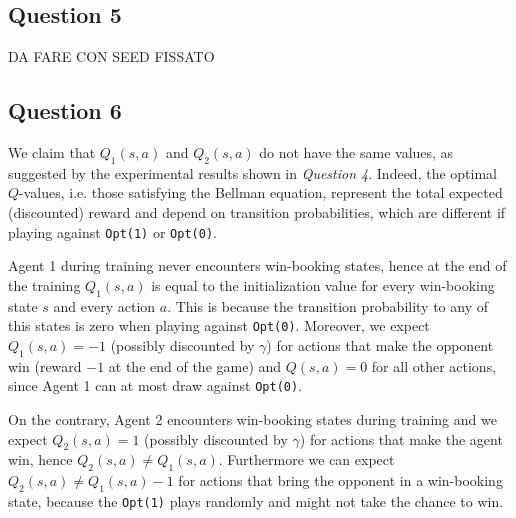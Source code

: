 \documentclass[10pt]{IEEEtran}
\begin{document}
\subsection*{Question 5}
DA FARE CON SEED FISSATO
\subsection*{Question 6}
We claim that $Q_1(s,a)$ and $Q_2(s,a)$ do not have the same values, as suggested by the experimental results shown in \emph{Question 4}.
Indeed, the optimal $Q$-values, i.e. those satisfying the Bellman equation, represent the total expected (discounted) reward and depend on transition probabilities, which are different if playing against \texttt{Opt(1)} or \texttt{Opt(0)}. 

Agent 1 during training never encounters win-booking states, hence at the end of the training $Q_1(s,a)$ is equal to the initialization value for every win-booking state $s$ and every action $a$. This is because the transition probability to any of this states is zero when playing against \texttt{Opt(0)}. Moreover, we expect $Q_1(s,a) = -1$ (possibly discounted by $\gamma$) for actions that make the opponent win (reward $-1$ at the end of the game) and $Q(s,a) = 0$ for all other actions, since Agent 1 can at most draw against \texttt{Opt(0)}. 

On the contrary, Agent 2 encounters win-booking states during training and we expect $Q_2(s,a) = 1$ (possibly discounted by $\gamma$) for actions that make the agent win, hence $Q_2(s,a) \neq Q_1(s,a)$. Furthermore we can expect $Q_2(s,a) \neq Q_1(s,a) -1$ for actions that bring the opponent in a win-booking state, because the \texttt{Opt(1)} plays randomly and might not take the chance to win.
\end{document}
